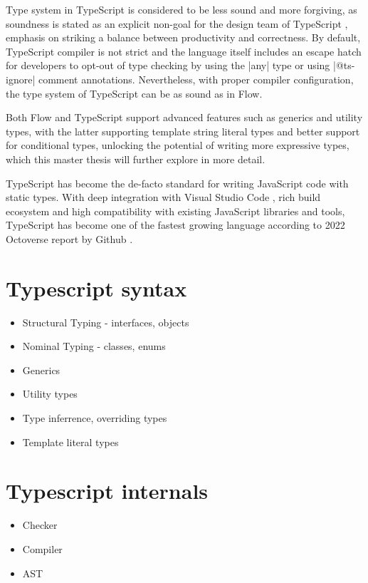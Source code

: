 Type system in TypeScript is considered to be less sound and more forgiving, as soundness is stated as an explicit non-goal for the design team of TypeScript \cite{TypeScriptDesignGoals}, emphasis on striking a balance between productivity and correctness. By default, TypeScript compiler is not strict and the language itself includes an escape hatch for developers to opt-out of type checking by using the \codeword|any| type or using \codeword|@ts-ignore| comment annotations. Nevertheless, with proper compiler configuration, the type system of TypeScript can be as sound as in Flow.

Both Flow and TypeScript support advanced features such as generics and utility types, with the latter supporting template string literal types and better support for conditional types, unlocking the potential of writing more expressive types, which this master thesis will further explore in more detail.

TypeScript has become the de-facto standard for writing JavaScript code with static types. With deep integration with Visual Studio Code \cite{VisualStudioCode}, rich build ecosystem and high compatibility with existing JavaScript libraries and tools, TypeScript has become one of the fastest growing language according to 2022 Octoverse report by Github \cite{Octoverse2022State}.

\section{Typescript syntax}

\begin{itemize}
  \item Structural Typing - interfaces, objects
  \item Nominal Typing - classes, enums
  \item Generics
  \item Utility types
  \item Type inferrence, overriding types
  \item Template literal types
\end{itemize}

\section{Typescript internals}

\begin{itemize}
  \item Checker
  \item Compiler
  \item AST
\end{itemize}

